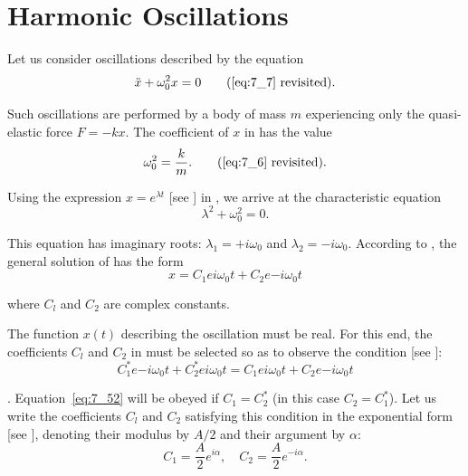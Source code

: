 \section{Harmonic Oscillations}\label{sec:7_5}

Let us consider oscillations described by the equation
\begin{equation*}
	\ddot{x} + \omega_0^2 x = 0\tag{\ref{eq:7_7} revisited}.
\end{equation*}

\noindent
Such oscillations are performed by a body of mass $m$ experiencing only the quasi-elastic force $F=-kx$. The coefficient of $x$ in  has the value
\begin{equation*}
	\omega_0^2 = \frac{k}{m}.\tag{\ref{eq:7_6} revisited}.
\end{equation*}

Using the expression $x=e^{\lambda t}$ [see ] in , we arrive at the characteristic equation
\begin{equation}\label{eq:7_50}
	\lambda^2 + \omega_0^2 = 0.
\end{equation}

\noindent
This equation has imaginary roots: $\lambda_1=+i\omega_0$ and $\lambda_2=-i\omega_0$. According to , the general solution of  has the form
\begin{equation}\label{eq:7_51}
	x = C_1 e{i\omega_0 t} + C_2 e{-i\omega_0 t}
\end{equation}

\noindent
where $C_l$ and $C_2$ are complex constants.

The function $x(t)$ describing the oscillation must be real. For this end, the coefficients $C_l$ and $C_2$ in  must be selected so as to observe the condition [see ]:
\begin{equation}\label{eq:7_52}
	C_1^* e{-i\omega_0 t} + C_2^* e{i\omega_0 t} = C_1 e{i\omega_0 t} + C_2 e{-i\omega_0 t}
\end{equation}

. Equation~\eqref{eq:7_52} will be obeyed if $C_1=C_2^*$ (in this case $C_2=C_1^*$). Let us write the coefficients $C_l$ and $C_2$ satisfying this condition in the exponential form [see ], denoting their modulus by $A/2$ and their argument by $\alpha$:
\begin{equation}\label{eq:7_53}
	C_1 = \frac{A}{2}e^{i\alpha},\quad 	C_2 = \frac{A}{2}e^{-i\alpha}.
\end{equation}

